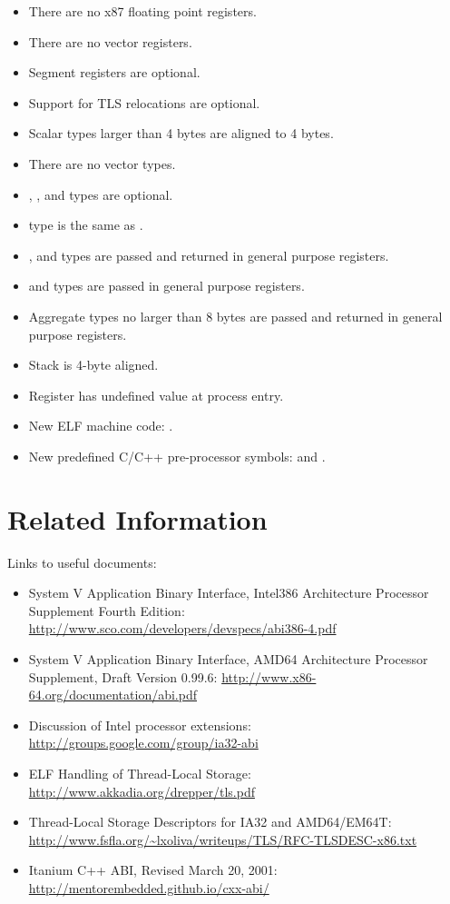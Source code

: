 \begin{itemize}
  \item There are no x87 floating point registers.
  \item There are no vector registers.
  \item Segment registers are optional.
  \item Support for TLS relocations are optional.
  \item Scalar types larger than 4 bytes are aligned to 4 bytes.
  \item There are no vector types.
  \item {}, , and 
	types are optional.
  \item {} type is the same as .
  \item {},  and  types are
	passed and returned in general purpose registers.
  \item {} and  types are passed
	in general purpose registers.
  \item Aggregate types no larger than 8 bytes are passed and returned
	in general purpose registers.
  \item Stack is 4-byte aligned.
  \item Register \EDX has undefined value at process entry.
  \item New ELF machine code: .
  \item New predefined C/C++ pre-processor symbols:  and
	.
\end{itemize}


\section{Related Information}

Links to useful documents:
\begin{itemize}
 \item System V Application Binary Interface, Intel386{\texttrademark} Architecture
       Processor Supplement Fourth Edition:
       \url{http://www.sco.com/developers/devspecs/abi386-4.pdf}
 \item System V Application Binary Interface, AMD64 Architecture Processor
       Supplement, Draft Version 0.99.6:
       \url{http://www.x86-64.org/documentation/abi.pdf}
 \item Discussion of Intel processor extensions:
       \url{http://groups.google.com/group/ia32-abi}
 \item ELF Handling of Thread-Local Storage:
       \url{http://www.akkadia.org/drepper/tls.pdf}
 \item Thread-Local Storage Descriptors for IA32 and AMD64/EM64T:
       \url{http://www.fsfla.org/~lxoliva/writeups/TLS/RFC-TLSDESC-x86.txt}
 \item Itanium C++ ABI, Revised March 20, 2001:
       \url{http://mentorembedded.github.io/cxx-abi/}
\end{itemize}

